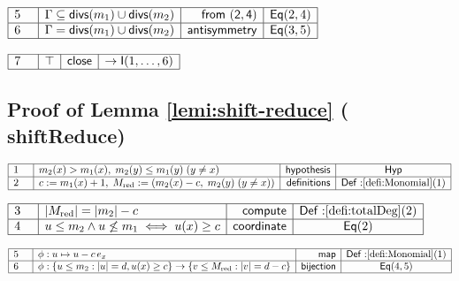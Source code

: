 \documentclass[11pt,reqno]{amsart}
\begin{document}
\nointerlineskip\noindent$%
\begin{array}{|m{0.5cm}|l|r|c|}
\hline
5 & \Gamma\subseteq\mathsf{divs}(m_{1})\cup\mathsf{divs}(m_{2}) & \mathsf{%
from\ (2,4)} & \mathsf{Eq}(2,4) \\ \hline
6 & \Gamma=\mathsf{divs}(m_{1})\cup\mathsf{divs}(m_{2}) & \mathsf{%
antisymmetry} & \mathsf{Eq}(3,5) \\ \hline
\end{array}%
$

\nointerlineskip\noindent$%
\begin{array}{|m{0.5cm}|l|r|c|}
\hline
7 & \top & \mathsf{close} & \to\mathsf{I}(1,\dots,6) \\ \hline
\end{array}%
$

\medskip

\subsection*{Proof of Lemma \protect\ref{lemi:shift-reduce} (\textsf{%
shiftReduce})}

\noindent $%
\begin{array}{|m{0.5cm}|l|r|c|}
\hline
1 & m_{2}(x)>m_{1}(x),\;m_{2}(y)\leq m_{1}(y)\;(y\neq x) & \mathsf{hypothesis%
} & \mathsf{Hyp} \\ \hline
2 & c:=m_{1}(x)+1,\;M_{\mathrm{red}}:=(m_{2}(x)-c,\;m_{2}(y)\;(y\neq x)) & 
\mathsf{definitions} & \mathsf{Def:}\ref{defi:Monomial}(1) \\ \hline
\end{array}%
$

\nointerlineskip\noindent$%
\begin{array}{|m{0.5cm}|l|r|c|}
\hline
3 & |M_{\mathrm{red}}|=|m_{2}|-c & \mathsf{compute} & \mathsf{Def:}\ref%
{defi:totalDeg}(2) \\ \hline
4 & u\le m_{2}\wedge u\not\le m_{1}\iff u(x)\ge c & \mathsf{coordinate} & 
\mathsf{Eq}(2) \\ \hline
\end{array}%
$

\nointerlineskip\noindent$%
\begin{array}{|m{0.5cm}|l|r|c|}
\hline
5 & \phi:u\mapsto u-c\,e_{x} & \mathsf{map} & \mathsf{Def:}\ref%
{defi:Monomial}(1) \\ \hline
6 & \phi:\{u\le m_{2}:|u|=d,u(x)\ge c\}\to\{v\le M_{\mathrm{red}}:|v|=d-c\}
& \mathsf{bijection} & \mathsf{Eq}(4,5) \\ \hline
\end{array}%
$
\end{document}
